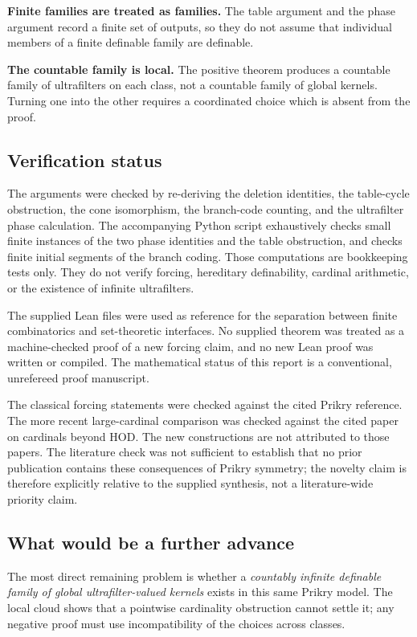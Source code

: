 \documentclass[11pt,letterpaper]{article}
\theoremstyle{definition}
\numberwithin{equation}{section}
\begin{document}
\textbf{Finite families are treated as families.}
The table argument and the phase argument record a finite set of outputs, so they do not assume that individual members of a finite definable family are definable.

\textbf{The countable family is local.}
The positive theorem produces a countable family of ultrafilters on each class, not a countable family of global kernels. Turning one into the other requires a coordinated choice which is absent from the proof.

\subsection{Verification status}

The arguments were checked by re-deriving the deletion identities, the table-cycle obstruction, the cone isomorphism, the branch-code counting, and the ultrafilter phase calculation. The accompanying Python script exhaustively checks small finite instances of the two phase identities and the table obstruction, and checks finite initial segments of the branch coding. Those computations are bookkeeping tests only. They do not verify forcing, hereditary definability, cardinal arithmetic, or the existence of infinite ultrafilters.

The supplied Lean files were used as reference for the separation between finite combinatorics and set-theoretic interfaces. No supplied theorem was treated as a machine-checked proof of a new forcing claim, and no new Lean proof was written or compiled. The mathematical status of this report is a conventional, unrefereed proof manuscript.

The classical forcing statements were checked against the cited Prikry reference. The more recent large-cardinal comparison was checked against the cited paper on cardinals beyond HOD. The new constructions are not attributed to those papers. The literature check was not sufficient to establish that no prior publication contains these consequences of Prikry symmetry; the novelty claim is therefore explicitly relative to the supplied synthesis, not a literature-wide priority claim.

\subsection{What would be a further advance}

The most direct remaining problem is whether a \emph{countably infinite definable family of global ultrafilter-valued kernels} exists in this same Prikry model. The local cloud shows that a pointwise cardinality obstruction cannot settle it; any negative proof must use incompatibility of the choices across classes.
\end{document}
